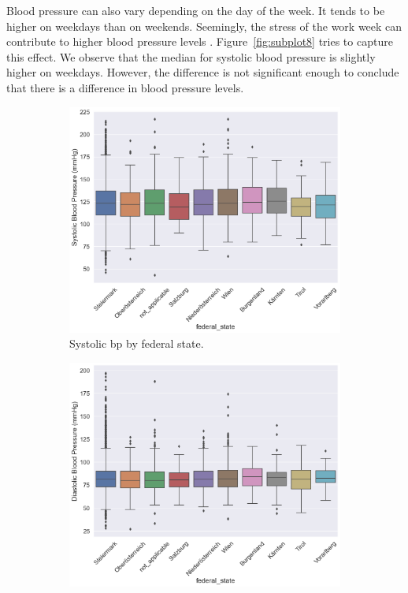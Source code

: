 \documentclass[12 pt]{scrartcl}
\numberwithin{equation}{section}
\begin{document}
Blood pressure can also vary depending on the day of the week. 
It tends to be higher on weekdays than on weekends. 
Seemingly, the stress of the work week can contribute to higher blood pressure levels \citep{juhanoja2016impact}.
Figure~\ref{fig:subplot8} tries to capture this effect. 
We observe that the median for systolic blood pressure is slightly higher on weekdays.
However, the difference is not significant enough to conclude that there is a difference in blood pressure levels.

\begin{figure}[H]
    \centering
    \begin{subfigure}[b]{0.45\textwidth}
        \includegraphics[width=\textwidth]{images/boxplot-state-sys.png}
        \caption{Systolic bp by federal state.}
        \label{fig:subplot5}
    \end{subfigure}
    \hfill
    \begin{subfigure}[b]{0.45\textwidth}
        \includegraphics[width=\textwidth]{images/boxplot-state-dia.png}

\end{subfigure}
\end{figure}
\end{document}
